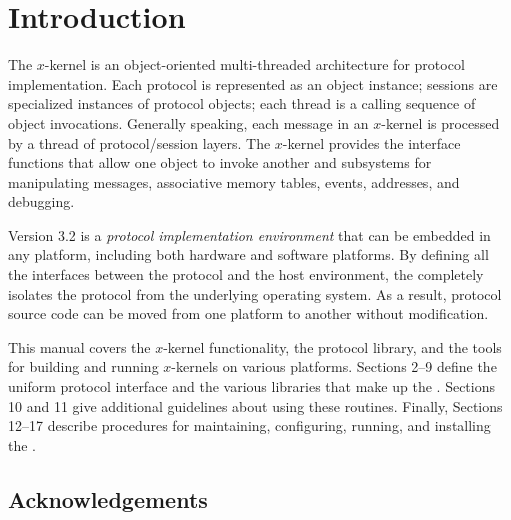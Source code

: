 %     
%
%
%
%
%

\section{Introduction}


The $x$-kernel is an object-oriented multi-threaded architecture for
protocol implementation.  Each protocol is represented as an object
instance; sessions are specialized instances of protocol objects; each
thread is a calling sequence of object invocations.  Generally
speaking, each message in an $x$-kernel is processed by a thread of
protocol/session layers.  The $x$-kernel provides the interface
functions that allow one object to invoke another and subsystems for
manipulating messages, associative memory tables, events, addresses,
and debugging.

Version 3.2 is a {\it protocol
implementation environment} that can be embedded in any platform,
including both hardware and software platforms. By defining all the
interfaces between the protocol and the host environment, the
\xk{} completely isolates the protocol from the underlying operating
system. As a result, protocol source code can be moved from one
platform to another without modification.

This manual covers the $x$-kernel functionality, the protocol library,
and the tools for building and running $x$-kernels on various
platforms. Sections 2--9 define the uniform protocol interface and the
various libraries that make up the \xk{}. Sections 10 and 11 give
additional guidelines about using these routines. Finally, Sections
12--17 describe procedures for maintaining, configuring, running, and
installing the \xk{}.

\subsection{Acknowledgements}

